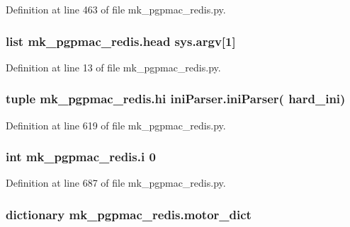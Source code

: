 Definition at line 463 of file mk\-\_\-pgpmac\-\_\-redis.\-py.

\hypertarget{namespacemk__pgpmac__redis_a760ff4955cbf5beef4ae36a28c30b01a}{
\subsubsection[{head}]{\setlength{\rightskip}{0pt plus 5cm}list mk\-\_\-pgpmac\-\_\-redis.\-head sys.\-argv\mbox{[}1\mbox{]}}}\label{namespacemk__pgpmac__redis_a760ff4955cbf5beef4ae36a28c30b01a}


Definition at line 13 of file mk\-\_\-pgpmac\-\_\-redis.\-py.

\hypertarget{namespacemk__pgpmac__redis_af0e472a4df25fc5c1660ef07226689a8}{
\subsubsection[{hi}]{\setlength{\rightskip}{0pt plus 5cm}tuple mk\-\_\-pgpmac\-\_\-redis.\-hi {\bf ini\-Parser.\-ini\-Parser}( {\bf hard\-\_\-ini})}}\label{namespacemk__pgpmac__redis_af0e472a4df25fc5c1660ef07226689a8}


Definition at line 619 of file mk\-\_\-pgpmac\-\_\-redis.\-py.

\hypertarget{namespacemk__pgpmac__redis_afa643a23a5984fe44c2182ada3dfa401}{
\subsubsection[{i}]{\setlength{\rightskip}{0pt plus 5cm}int mk\-\_\-pgpmac\-\_\-redis.\-i 0}}\label{namespacemk__pgpmac__redis_afa643a23a5984fe44c2182ada3dfa401}


Definition at line 687 of file mk\-\_\-pgpmac\-\_\-redis.\-py.

\hypertarget{namespacemk__pgpmac__redis_ad8583d4fe88c4c98af73d2858c51c660}{
\subsubsection[{motor\-\_\-dict}]{\setlength{\rightskip}{0pt plus 5cm}dictionary mk\-\_\-pgpmac\-\_\-redis.\-motor\-\_\-dict}}\label{namespacemk__pgpmac__redis_ad8583d4fe88c4c98af73d2858c51c660}


